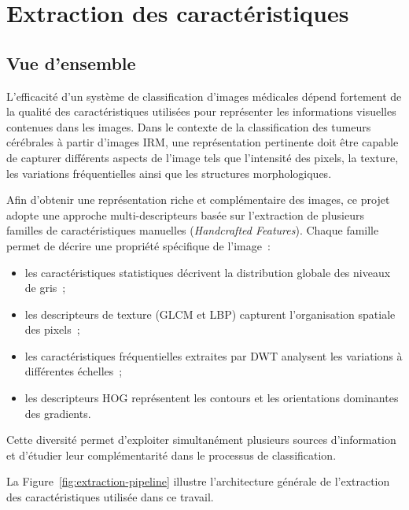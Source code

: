 \chapter{Extraction des caractéristiques}

\section{Vue d'ensemble}

L'efficacité d'un système de classification d'images médicales dépend fortement de la qualité
des caractéristiques utilisées pour représenter les informations visuelles contenues dans les
images. Dans le contexte de la classification des tumeurs cérébrales à partir d'images IRM, une
représentation pertinente doit être capable de capturer différents aspects de l'image tels que
l'intensité des pixels, la texture, les variations fréquentielles ainsi que les structures
morphologiques.

Afin d'obtenir une représentation riche et complémentaire des images, ce projet adopte une
approche multi-descripteurs basée sur l'extraction de plusieurs familles de caractéristiques
manuelles (\emph{Handcrafted Features}). Chaque famille permet de décrire une propriété
spécifique de l'image~:

\begin{itemize}[leftmargin=1.4em,itemsep=2pt]
  \item les caractéristiques statistiques décrivent la distribution globale des niveaux de gris~;
  \item les descripteurs de texture (GLCM et LBP) capturent l'organisation spatiale des pixels~;
  \item les caractéristiques fréquentielles extraites par DWT analysent les variations à
        différentes échelles~;
  \item les descripteurs HOG représentent les contours et les orientations dominantes des
        gradients.
\end{itemize}

Cette diversité permet d'exploiter simultanément plusieurs sources d'information et d'étudier
leur complémentarité dans le processus de classification.

La Figure~\ref{fig:extraction-pipeline} illustre l'architecture générale de l'extraction des
caractéristiques utilisée dans ce travail.


